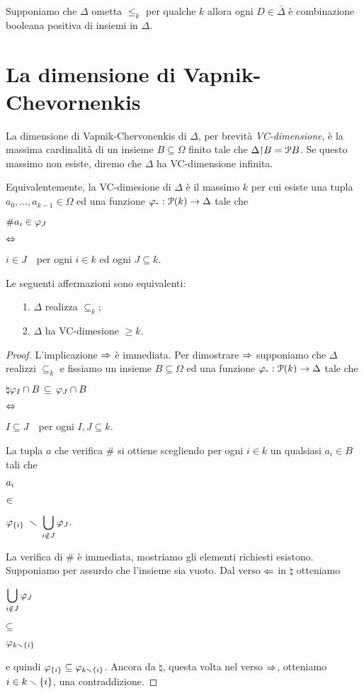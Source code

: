 \begin{corollary} Supponiamo che $\Delta$ ometta $\le_k$ per qualche $k$ allora ogni $D\in\bar\Delta$ \`e combinazione booleana positiva di insiemi in $\Delta$.
\end{corollary}


\def\ceq#1#2#3{\parbox[t]{25ex}{$\displaystyle #1$}\parbox{6ex}{$\displaystyle\hfil #2$}{$\displaystyle #3$}}


\section{La dimensione di Vapnik-Chevornenkis}


La dimensione di Vapnik-Cher\-vo\-nen\-kis di $\Delta$, per brevit\`a \emph{VC-dimensione}, \`e  la massima cardinalit\`a di un insieme $B\subseteq\Omega$ finito tale che $\Delta\mathord\restriction B=\P B$. Se questo massimo non esiste, diremo che $\Delta$ ha VC-dimensione infinita. 

Equivalentemente, la VC-dimesione di $\Delta$ \`e il massimo $k$ per cui esiste una tupla $a_0,\dots,a_{k-1}\in\Omega$ ed una funzione $\phi_{\mbox{-}}:\P(k)\to\Delta$ tale che 

\ceq{\#\hfill a_i\in\phi_J}{\IFF}{i\in J}\ \  per ogni $i\in k$ ed ogni $J\subseteq k$.

\begin{lemma}
Le seguenti affermazioni sono equivalenti:
\begin{itemize}
\item[1.] $\Delta$ realizza $\subseteq_k$;
\item[2.] $\Delta$ ha VC-dimesione $\ge k$.
\end{itemize}  
\end{lemma}

\begin{proof}
L'implicazione $\IMP$ \`e immediata. Per dimostrare $\IMP$ supponiamo che $\Delta$ realizzi $\subseteq_k$ e fissiamo un insieme $B\subseteq\Omega$ ed una funzione $\phi_{\mbox{-}}:\P(k)\to\Delta$ tale che  

\ceq{\natural\hfill\phi_I\cap B\,\subseteq\,\phi_J\cap B}{\IFF}{I\subseteq J}\ \ per ogni $I,J\subseteq k$.

La tupla $a$ che verifica $\#$ si ottiene scegliendo per ogni $i\in k$ un qualsiasi $a_i\in B$ tali che 

\ceq{\hfill a_i}{\in}{\phi_{\{i\}}\;\sm\;\bigcup_{i\notin J}\phi_J}.

La verifica di $\#$ \`e immediata, mostriamo gli elementi richiesti esistono. Supponiamo per assurdo che l'insieme sia vuoto. Dal verso $\PMI$ in $\natural$ otteniamo

\ceq{\hfill\bigcup_{i\notin J}\phi_J}{\subseteq}{\phi_{k\sm\{i\}}}

e quindi $\phi_{\{i\}}\subseteq\phi_{k\sm\{i\}}$. Ancora da $\natural$, questa volta nel verso $\IMP$, otteniamo $i\in k\sm\{i\}$, una contraddizione.
\end{proof}

